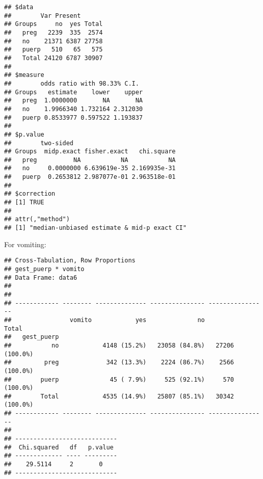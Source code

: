 \documentclass[
]{article}
\newenvironment{Shaded}{\begin{snugshade}}{\end{snugshade}}
\newcommand{\DataTypeTok}[1]{\textcolor[rgb]{0.13,0.29,0.53}{#1}}
\newcommand{\KeywordTok}[1]{\textcolor[rgb]{0.13,0.29,0.53}{\textbf{#1}}}
\newcommand{\NormalTok}[1]{#1}
\newcommand{\OperatorTok}[1]{\textcolor[rgb]{0.81,0.36,0.00}{\textbf{#1}}}
\newcommand{\OtherTok}[1]{\textcolor[rgb]{0.56,0.35,0.01}{#1}}
\newcommand{\StringTok}[1]{\textcolor[rgb]{0.31,0.60,0.02}{#1}}
\begin{document}
\begin{verbatim}
## $data
##        Var Present
## Groups     no  yes Total
##   preg   2239  335  2574
##   no    21371 6387 27758
##   puerp   510   65   575
##   Total 24120 6787 30907
## 
## $measure
##        odds ratio with 98.33% C.I.
## Groups   estimate    lower    upper
##   preg  1.0000000       NA       NA
##   no    1.9966340 1.732164 2.312030
##   puerp 0.8533977 0.597522 1.193837
## 
## $p.value
##        two-sided
## Groups  midp.exact fisher.exact   chi.square
##   preg          NA           NA           NA
##   no     0.0000000 6.639619e-35 2.169935e-31
##   puerp  0.2653812 2.987077e-01 2.963518e-01
## 
## $correction
## [1] TRUE
## 
## attr(,"method")
## [1] "median-unbiased estimate & mid-p exact CI"
\end{verbatim}

For vomiting:

\begin{Shaded}
\end{Shaded}

\begin{verbatim}
## Cross-Tabulation, Row Proportions  
## gest_puerp * vomito  
## Data Frame: data6  
## 
## 
## ------------ -------- -------------- --------------- ----------------
##                vomito            yes              no            Total
##   gest_puerp                                                         
##           no            4148 (15.2%)   23058 (84.8%)   27206 (100.0%)
##         preg             342 (13.3%)    2224 (86.7%)    2566 (100.0%)
##        puerp              45 ( 7.9%)     525 (92.1%)     570 (100.0%)
##        Total            4535 (14.9%)   25807 (85.1%)   30342 (100.0%)
## ------------ -------- -------------- --------------- ----------------
## 
## ----------------------------
##  Chi.squared   df   p.value 
## ------------- ---- ---------
##    29.5114     2       0    
## ----------------------------
\end{verbatim}

\begin{Shaded}
\end{Shaded}
\end{document}
